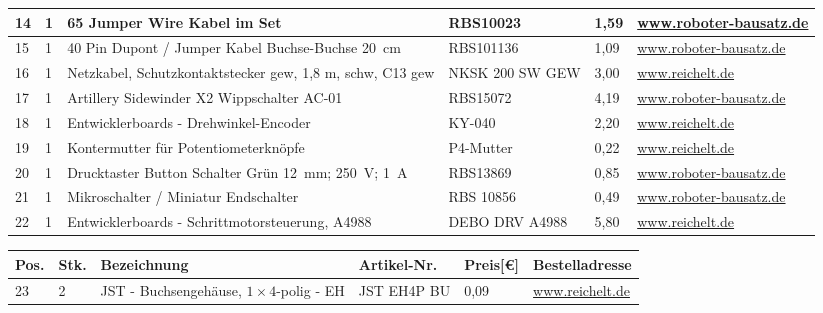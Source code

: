 \begin{center}
\begin{tabularx}{\textwidth}{|p{0.4cm}|p{0.4cm}|X|X|p{1cm}|X|}
		\hline
		14 & 1 & 65 Jumper Wire Kabel im Set & RBS10023 & 1,59 & \href{https://www.roboter-bausatz.de/p/65-jumper-wire-kabel-im-set}{www.roboter-bausatz.de} \\
		\hline
		15 & 1 & 40 Pin Dupont / Jumper Kabel Buchse-Buchse 20\ cm & RBS101136 & 1,09 & \href{https://www.roboter-bausatz.de/p/40-pin-dupont-jumper-kabel-buchse-buchse-20-cm}{www.roboter-bausatz.de} \\
		\hline
		16 & 1 & Netzkabel, Schutzkontaktstecker gew, 1,8 m, schw, C13 gew & NKSK 200 SW GEW & 3,00 & \href{https://www.reichelt.de/sg/de/netzkabel-schutzkontaktstecker-gew-1-8-m-schw-c13-gew-nksk-200-sw-gew-p113125.html}{www.reichelt.de} \\
		\hline
		17 & 1 & Artillery Sidewinder X2 Wippschalter AC-01 & RBS15072 & 4,19 & \href{https://www.roboter-bausatz.de/p/artillery-sidewinder-x2-wippschalter-ac-01}{www.roboter-bausatz.de} \\
		\hline
		18 & 1 & Entwicklerboards - Drehwinkel-Encoder & KY-040 & 2,20 & \href{https://www.reichelt.de/sg/de/entwicklerboards-drehwinkel-encoder-ky-040-debo-encoder-p282545.html}{www.reichelt.de} \\
		\hline
		19 & 1 & Kontermutter für Potentiometerknöpfe & P4-Mutter & 0,22 & \href{https://www.reichelt.de/sg/de/kontermutter-fuer-potentiometerknoepfe-schwarz-p4-mutter-p13757.html}{www.reichelt.de} \\
		\hline
		20 & 1 & Drucktaster Button Schalter Grün 12\ mm; 250\ V; 1\ A  & RBS13869 & 0,85 & \href{https://www.roboter-bausatz.de/p/drucktaster-button-schalter-gruen-12mm-250v-1a}{www.roboter-bausatz.de} \\
		\hline
		21 & 1 & Mikroschalter / Miniatur Endschalter & RBS 10856 & 0,49 & \href{https://www.roboter-bausatz.de/p/mikroschalter-miniatur-endschalter}{www.roboter-bausatz.de} \\
		\hline
		22 & 1 & Entwicklerboards - Schrittmotorsteuerung, A4988 & DEBO DRV A4988 & 5,80 & \href{https://www.reichelt.de/sg/de/entwicklerboards-schrittmotorsteuerung-a4988-debo-drv-a4988-p282646.html}{www.reichelt.de} \\
		\hline
	\end{tabularx}
	\newpage
	\fontsize{8}{10}\selectfont
	\begin{tabularx}{\textwidth}{|p{0.4cm}|p{0.4cm}|X|X|p{1cm}|X|}
		\hline 
		\textbf{Pos.} & \textbf{Stk.} & \textbf{Bezeichnung} & \textbf{Artikel-Nr.} & \textbf{Preis[€]} & \textbf{Bestelladresse} \\ \hline
		23 & 2 & JST - Buchsengehäuse, $1 \times 4$-polig - EH & JST EH4P BU & 0,09 & \href{https://wwww.reichelt.de}{www.reichelt.de} \\

\end{tabularx}
\end{center}
